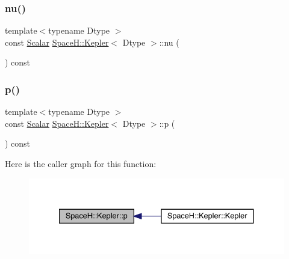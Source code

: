 \mbox{\label{struct_space_h_1_1_kepler_ac0853e59c86fc53e46f13dcfaa03930a}} 
\subsubsection{\texorpdfstring{nu()}{nu()}}
{\footnotesize\ttfamily template$<$typename Dtype $>$ \\
const \mbox{\hyperlink{struct_space_h_1_1_kepler_a19291f268209f594a96fb4828fa1a54c}{Scalar}} \mbox{\hyperlink{struct_space_h_1_1_kepler}{Space\+H\+::\+Kepler}}$<$ Dtype $>$\+::nu (\begin{DoxyParamCaption}{ }\end{DoxyParamCaption}) const\hspace{0.3cm}{\ttfamily [inline]}}

\mbox{\label{struct_space_h_1_1_kepler_a7355f57b679ccf074aecb26c2eaad7f5}} 
\subsubsection{\texorpdfstring{p()}{p()}}
{\footnotesize\ttfamily template$<$typename Dtype $>$ \\
const \mbox{\hyperlink{struct_space_h_1_1_kepler_a19291f268209f594a96fb4828fa1a54c}{Scalar}} \mbox{\hyperlink{struct_space_h_1_1_kepler}{Space\+H\+::\+Kepler}}$<$ Dtype $>$\+::p (\begin{DoxyParamCaption}{ }\end{DoxyParamCaption}) const\hspace{0.3cm}{\ttfamily [inline]}}

Here is the caller graph for this function\+:
\nopagebreak
\begin{figure}[H]
\begin{center}
\leavevmode
\includegraphics[width=334pt]{struct_space_h_1_1_kepler_a7355f57b679ccf074aecb26c2eaad7f5_icgraph}
\end{center}
\end{figure}
\mbox{\label{struct_space_h_1_1_kepler_a9c646058e884c4e759039e504c4616c2}} 
